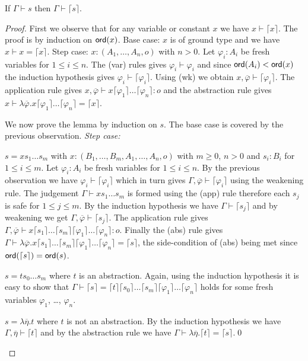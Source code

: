 \documentclass{llncs}
\newcommand{\elnf}[1]{\lceil #1\rceil} %
\begin{document}
\begin{lemma}
\label{lem:elnf_preserves_safety}
If $\Gamma \vdash s$ then $\Gamma \vdash \elnf{s}$.
\end{lemma}
\begin{proof}

  First we observe that for any variable or constant $x$ we have $x
  \vdash \elnf{x}$. The proof is by induction on ${\sf ord}(x)$. Base case:
  $x$ is of ground type and we have $x \vdash x = \elnf{x}$. Step
  case: $x:(A_1, \ldots, A_n,o)$ with $n>0$. Let $\varphi_i:A_i$ be
  fresh variables for $1\leq i\leq n$. The (var) rules gives
  $\varphi_i \vdash \varphi_i$ and since ${\sf ord}(A_i) < {\sf ord}(x)$ the
  induction hypothesis gives $\varphi_i \vdash
  \elnf{\varphi_i}$. Using (wk) we obtain $x, \overline{\varphi}
  \vdash \elnf{\varphi_i}$.  The application rule gives $x,
  \overline{\varphi} \vdash x \elnf{\varphi_1} \ldots \elnf{\varphi_n}
  : o$ and the abstraction rule gives $ x \vdash \lambda
  \overline{\varphi} . x \elnf{\varphi_1} \ldots \elnf{\varphi_n} =
  \elnf{x}$.


We now prove the lemma by induction on $s$.
The base case is covered by the previous observation.
\emph{Step case:}
\begin{compactitem}
\item $s = x s_1 \ldots s_m$ with $x: (B_1, \ldots, B_m, A_1, \ldots,
  A_n, o)$ with $m\geq 0$, $n>0$ and $s_i : B_i$ for $1 \leq i \leq
  m$.  Let $\varphi_i: A_i$ be fresh variables for $1\leq i \leq
  n$. By the previous observation we have $\varphi_i \vdash
  \elnf{\varphi_i}$ which in turn gives $\Gamma , \overline{\varphi}
  \vdash \elnf{\varphi_i}$ using the weakening rule.  The judgement
  $\Gamma \vdash x s_1 \ldots s_m$ is formed using the (app) rule
  therefore each $s_j$ is safe for $1\leq j \leq m$. By the induction
  hypothesis we have $\Gamma \vdash \elnf{s_j}$ and by weakening we
  get $\Gamma, \overline{\varphi} \vdash \elnf{s_j}$.  The application
  rule gives $\Gamma, \overline{\varphi} \vdash x \elnf{s_1} \ldots
  \elnf{s_m} \elnf{\varphi_1} \ldots \elnf{\varphi_n} : o$. Finally
  the (abs) rule gives $\Gamma \vdash \lambda \overline{\varphi} . x
  \elnf{s_1} \ldots \elnf{s_m} \elnf{\varphi_1} \ldots
  \elnf{\varphi_n} = \elnf{s}$, the side-condition of (abs) being met
  since $\ord{\elnf{s}} = \ord{s}$.


\item $s = t s_0 \ldots s_m$ where $t$ is an abstraction. Again, using
  the induction hypothesis it is easy to show that $\Gamma \vdash
  \elnf{s} = \elnf{t} \elnf{s_0} \ldots \elnf{s_m} \elnf{\varphi_1}
  \ldots \elnf{\varphi_n}$ holds for some fresh variables $\varphi_1$,
  \ldots, $\varphi_n$.

\item $s = \lambda \overline{\eta} . t$ where $t$ is not an
  abstraction. By the induction hypothesis we have $\Gamma,
  \overline{\eta} \vdash \elnf{t}$ and by the abstraction rule we have
  $\Gamma \vdash \lambda \overline{\eta} . \elnf{t} = \elnf{s}$.\qed
\end{compactitem}
\end{proof}
\end{document}
